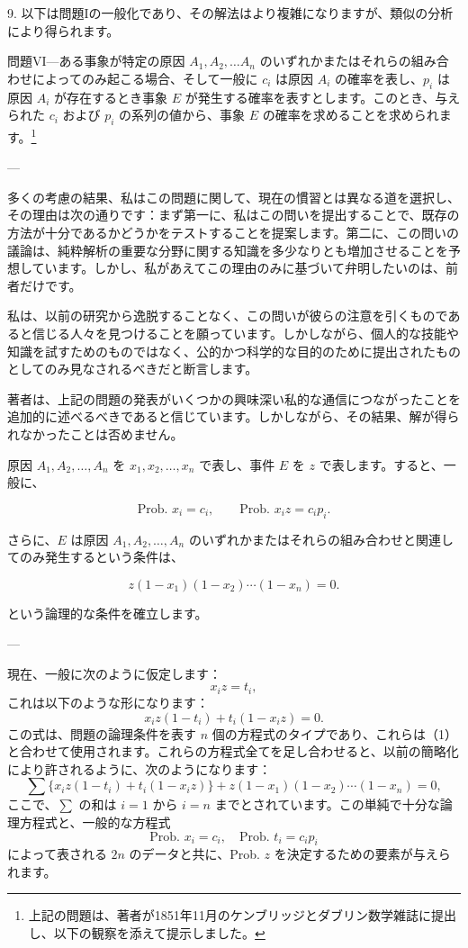\documentclass[a4paper,11pt,openany]{ltjsbook}
\begin{document}
9. 以下は問題Iの一般化であり、その解法はより複雑になりますが、類似の分析により得られます。

\textsc{問題VI}---ある事象が特定の原因 $A_1, A_2, \dotsc A_n$ のいずれかまたはそれらの組み合わせによってのみ起こる場合、そして一般に $c_i$ は原因 $A_i$ の確率を表し、$p_i$ は原因 $A_i$ が存在するとき事象 $E$ が発生する確率を表すとします。このとき、与えられた $c_i$ および $p_i$ の系列の値から、事象 $E$ の確率を求めることを求められます。\footnote{
上記の問題は、著者が1851年11月のケンブリッジとダブリン数学雑誌に提出し、以下の観察を添えて提示しました。}

---

多くの考慮の結果、私はこの問題に関して、現在の慣習とは異なる道を選択し、その理由は次の通りです：まず第一に、私はこの問いを提出することで、既存の方法が十分であるかどうかをテストすることを提案します。第二に、この問いの議論は、純粋解析の重要な分野に関する知識を多少なりとも増加させることを予想しています。しかし、私があえてこの理由のみに基づいて弁明したいのは、前者だけです。

私は、以前の研究から逸脱することなく、この問いが彼らの注意を引くものであると信じる人々を見つけることを願っています。しかしながら、個人的な技能や知識を試すためのものではなく、公的かつ科学的な目的のために提出されたものとしてのみ見なされるべきだと断言します。

著者は、上記の問題の発表がいくつかの興味深い私的な通信につながったことを追加的に述べるべきであると信じています。しかしながら、その結果、解が得られなかったことは否めません。

原因 $A_1, A_2, \dotsc, A_n$ を $x_1, x_2, \dotsc, x_n$ で表し、事件 $E$ を $z$ で表します。すると、一般に、

\[
\text{Prob. }x_i = c_i,\qquad \text{Prob. }x_i z = c_i p_i.
\]

さらに、$E$ は原因 $A_1, A_2, \dotsc, A_n$ のいずれかまたはそれらの組み合わせと関連してのみ発生するという条件は、

\[
z(1-x_1)(1-x_2) \dotsm (1-x_n) = 0.   \tag{1}
\]

という論理的な条件を確立します。

---

現在、一般に次のように仮定します：
\[
x_i z = t_i,
\]
これは以下のような形になります：
\[
x_i z(1 - t_i) + t_i (1 - x_i z) = 0.
\]
この式は、問題の論理条件を表す $n$ 個の方程式のタイプであり、これらは（1）と合わせて使用されます。これらの方程式全てを足し合わせると、以前の簡略化により許されるように、次のようになります：
\[
\sum \{ x_i z(1 - t_i) + t_i (1 - x_i z) \} + z(1 - x_1)(1 - x_2) \cdots (1 - x_n) = 0,   \tag{2}
\]
ここで、$\sum$ の和は $i = 1$ から $i = n$ までとされています。この単純で十分な論理方程式と、一般的な方程式
\[
\text{Prob. } x_i = c_i, \quad \text{Prob. } t_i = c_i p_i   \tag{3}
\]
によって表される $2n$ のデータと共に、Prob. $z$ を決定するための要素が与えられます。
\end{document}
